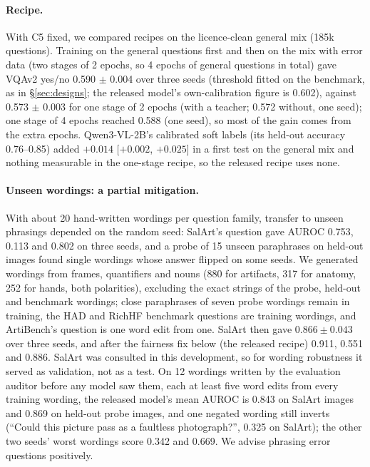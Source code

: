 \documentclass[10pt]{article}
\begin{document}
\paragraph{Recipe.} With C5 fixed, we compared recipes on the licence-clean general mix (185k questions). Training on the general questions first and then on the mix with error data (two stages of 2 epochs, so 4 epochs of general questions in total) gave VQAv2 yes/no 0.590 $\pm$ 0.004 over three seeds (threshold fitted on the benchmark, as in \S\ref{sec:designs}; the released model's own-calibration figure is 0.602), against 0.573 $\pm$ 0.003 for one stage of 2 epochs (with a teacher; 0.572 without, one seed); one stage of 4 epochs reached 0.588 (one seed), so most of the gain comes from the extra epochs. Qwen3-VL-2B's calibrated soft labels (its held-out accuracy 0.76--0.85) added $+0.014$ [$+0.002$, $+0.025$] in a first test on the general mix and nothing measurable in the one-stage recipe, so the released recipe uses none.

\paragraph{Unseen wordings: a partial mitigation.} With about 20 hand-written wordings per question family, transfer to unseen phrasings depended on the random seed: SalArt's question gave AUROC 0.753, 0.113 and 0.802 on three seeds, and a probe of 15 unseen paraphrases on held-out images found single wordings whose answer flipped on some seeds. We generated wordings from frames, quantifiers and nouns (880 for artifacts, 317 for anatomy, 252 for hands, both polarities), excluding the exact strings of the probe, held-out and benchmark wordings; close paraphrases of seven probe wordings remain in training, the HAD and RichHF benchmark questions are training wordings, and ArtiBench's question is one word edit from one. SalArt then gave $0.866 \pm 0.043$ over three seeds, and after the fairness fix below (the released recipe) 0.911, 0.551 and 0.886. SalArt was consulted in this development, so for wording robustness it served as validation, not as a test. On 12 wordings written by the evaluation auditor before any model saw them, each at least five word edits from every training wording, the released model's mean AUROC is 0.843 on SalArt images and 0.869 on held-out probe images, and one negated wording still inverts (``Could this picture pass as a faultless photograph?'', 0.325 on SalArt); the other two seeds' worst wordings score 0.342 and 0.669. We advise phrasing error questions positively.
\end{document}
